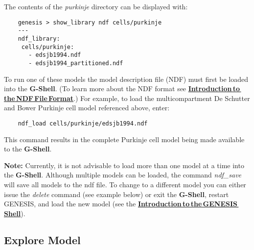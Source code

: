 \documentclass[12pt]{article}
\begin{document}
The contents of the {\it purkinje} directory can be displayed with:
\begin{verbatim}
    genesis > show_library ndf cells/purkinje
    ---
    ndf_library:
     cells/purkinje:
       - edsjb1994.ndf
       - edsjb1994_partitioned.ndf
\end{verbatim}

To run one of these models the model description file (NDF) must first be loaded into the {\bf G-Shell}.  (To learn more about the NDF format see  \href{../ndf-file-format/ndf-file-format.tex}{\bf Introduction\,to\,the\,NDF\,File\,Format}.) For example, to load the multicompartment De Schutter and Bower Purkinje cell model referenced above, enter:
\begin{verbatim}
    ndf_load cells/purkinje/edsjb1994.ndf
\end{verbatim}
This command results in the complete Purkinje cell model being made available to the {\bf G-Shell}.

{\bf Note:} Currently, it is not advisable to load more than one model at a time into the {\bf G-Shell}. Although multiple models can be loaded, the command {\it ndf\_save} will save all models to the ndf file. To change to a different model you can either issue the {\it delete} command (see example below) or exit the {\bf G-Shell}, restart GENESIS, and load the new model (see the \href{../gshell/gshell.tex}{\bf Introduction\,to\,the\,GENESIS\,Shell}).

\subsection*{Explore Model}
\end{document}
